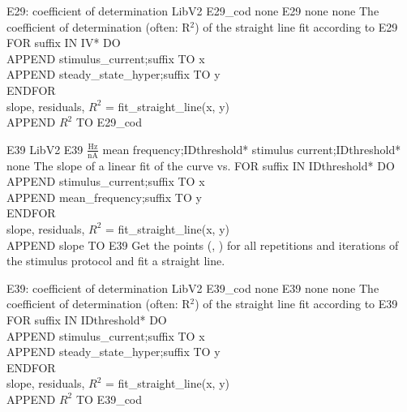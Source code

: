 \begin{efeature}
  {E29: coefficient of determination}
  {LibV2}
  {E29\_cod}
  {none}
  {E29}
  {none}
  {none}
  {The coefficient of determination (often: R$^2$) of the straight line fit according to E29}
  {
  FOR suffix IN IV* DO \+ \\
    APPEND stimulus\_current;suffix TO x \\
    APPEND steady\_state\_hyper;suffix TO y \- \\
  ENDFOR \\
  slope, residuals, $R^2$ = fit\_straight\_line(x, y) \\
  APPEND $R^2$ TO E29\_cod
  }
  
\end{efeature}

\begin{efeature}
  {E39}
  {LibV2}
  {E39}
  {$\frac{\mathrm{Hz}}{\mathrm{nA}}$}
  {mean frequency;IDthreshold*}
  {stimulus current;IDthreshold*}
  {none}
  {The slope of a linear fit of the curve  vs. }
  {
  FOR suffix IN IDthreshold* DO \+ \\
    APPEND stimulus\_current;suffix TO x \\
    APPEND mean\_frequency;suffix TO y \- \\
  ENDFOR \\
  slope, residuals, $R^2$ = fit\_straight\_line(x, y) \\
  APPEND slope TO E39
  }
  Get the points (, ) for all repetitions and iterations of the stimulus protocol  and fit a straight line.

\end{efeature}

\begin{efeature}
  {E39: coefficient of determination}
  {LibV2}
  {E39\_cod}
  {none}
  {E39}
  {none}
  {none}
  {The coefficient of determination (often: R$^2$) of the straight line fit according to E39}
  {
  FOR suffix IN IDthreshold* DO \+ \\
    APPEND stimulus\_current;suffix TO x \\
    APPEND steady\_state\_hyper;suffix TO y \- \\
  ENDFOR \\
  slope, residuals, $R^2$ = fit\_straight\_line(x, y) \\
  APPEND $R^2$ TO E39\_cod
  }
  
\end{efeature}

